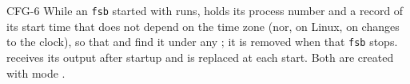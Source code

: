\begin{req}{CFG-6}
While an \texttt{fsb} started with  runs,
 holds its process number and a record of its start
time that does not depend on the time zone (nor, on Linux, on changes to the clock),
so that  and  find it under any ; it is removed when that
\texttt{fsb} stops.   receives its output
after startup and is replaced at each  start.  Both are created
with mode .
\end{req}
